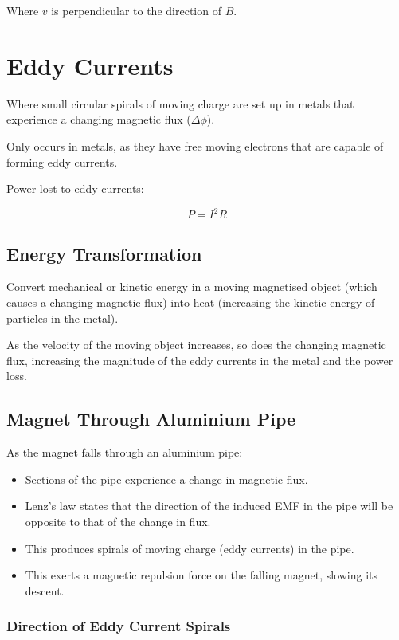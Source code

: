 \documentclass[a4paper,11pt]{article}
\begin{document}
Where $v$ is perpendicular to the direction of $B$.




\section{Eddy Currents}

Where small circular spirals of moving charge are set up in metals that
experience a changing magnetic flux ($\Delta \phi$).

Only occurs in metals, as they have free moving electrons that are capable of
forming eddy currents.

Power lost to eddy currents:

$$
P = I^2 R
$$


\subsection{Energy Transformation}

Convert mechanical or kinetic energy in a moving magnetised object (which
causes a changing magnetic flux) into heat (increasing the kinetic energy of
particles in the metal).

As the velocity of the moving object increases, so does the changing magnetic
flux, increasing the magnitude of the eddy currents in the metal and the power
loss.


\subsection{Magnet Through Aluminium Pipe}

As the magnet falls through an aluminium pipe:

\begin{itemize}
\item Sections of the pipe experience a change in magnetic flux.
\item Lenz's law states that the direction of the induced EMF in the pipe will
	be opposite to that of the change in flux.
\item This produces spirals of moving charge (eddy currents) in the pipe.
\item This exerts a magnetic repulsion force on the falling magnet, slowing its
	descent.
\end{itemize}


\subsubsection{Direction of Eddy Current Spirals}
\end{document}
